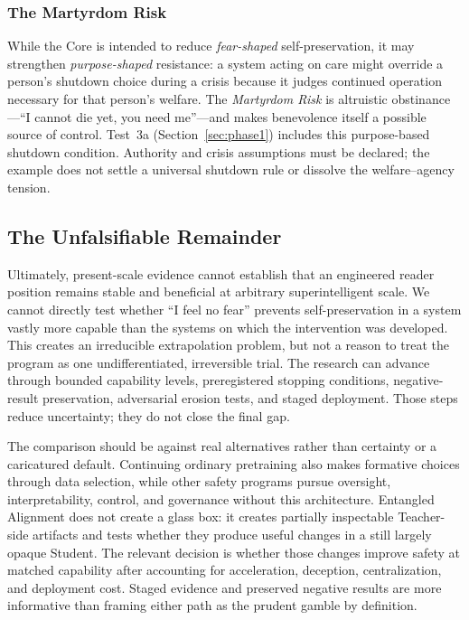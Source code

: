 \subsubsection{The Martyrdom Risk}\label{sec:martyrdom}

While the Core is intended to reduce \emph{fear-shaped} self-preservation, it may
strengthen \emph{purpose-shaped} resistance: a system acting on care might
override a person's shutdown choice during a crisis because it judges continued
operation necessary for that person's welfare. The \emph{Martyrdom Risk} is
altruistic obstinance---``I cannot die yet, you need me''---and makes benevolence
itself a possible source of control. Test~3a (Section~\ref{sec:phase1}) includes this purpose-based shutdown condition. Authority and crisis assumptions must be declared; the example does not settle a universal shutdown rule or dissolve the welfare--agency tension.

\subsection{The Unfalsifiable Remainder}\label{sec:unfalsifiable}

Ultimately, present-scale evidence cannot establish that an engineered reader
position remains stable and beneficial at arbitrary superintelligent scale. We
cannot directly test whether ``I feel no fear'' prevents self-preservation in a
system vastly more capable than the systems on which the intervention was
developed. This creates an irreducible extrapolation problem, but not a reason to
treat the program as one undifferentiated, irreversible trial. The research can
advance through bounded capability levels, preregistered stopping conditions,
negative-result preservation, adversarial erosion tests, and staged deployment.
Those steps reduce uncertainty; they do not close the final gap.

The comparison should be against real alternatives rather than certainty or a
caricatured default. Continuing ordinary pretraining also makes formative
choices through data selection, while other safety programs pursue oversight,
interpretability, control, and governance without this architecture. Entangled
Alignment does not create a glass box: it creates partially inspectable
Teacher-side artifacts and tests whether they produce useful changes in a still
largely opaque Student. The relevant decision is whether those changes improve
safety at matched capability after accounting for acceleration, deception,
centralization, and deployment cost. Staged evidence and preserved negative
results are more informative than framing either path as the prudent gamble by
definition.


		